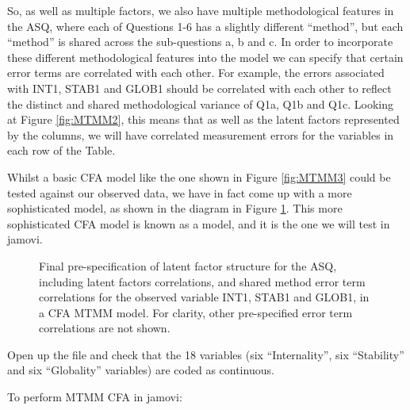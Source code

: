 So, as well as multiple factors, we also have multiple methodological features in the ASQ, where each of Questions 1-6 has a slightly different “method”, but each “method” is shared across the sub-questions a, b and c. In order to incorporate these different methodological features into the model we can specify that certain error terms are correlated with each other. For example, the errors associated with INT1, STAB1 and GLOB1 should be correlated with each other to reflect the distinct and shared methodological variance of Q1a, Q1b and Q1c. Looking at Figure \ref{fig:MTMM2}, this means that as well as the latent factors represented by the columns, we will have correlated measurement errors for the variables in each row of the Table. 

Whilst a basic CFA model like the one shown in Figure \ref{fig:MTMM3} could be tested against our observed data, we have in fact come up with a more sophisticated model, as shown in the diagram in Figure \ref{fig:MTMM4}. This more sophisticated CFA model is known as a  model, and it is the one we will test in jamovi.

\begin{figure}[p]
\begin{center}
\caption{Final pre-specification of latent factor structure for the ASQ, including latent factors correlations, and shared method error term correlations for the observed variable INT1, STAB1 and GLOB1, in a CFA MTMM model. For clarity, other pre-specified error term correlations are not shown.}
\label{fig:MTMM4}
\HR
\end{center}
\end{figure}


Open up the  file and check that the 18 variables (six “Internality”, six “Stability” and six “Globality” variables) are coded as continuous. 

To perform MTMM CFA in jamovi:

